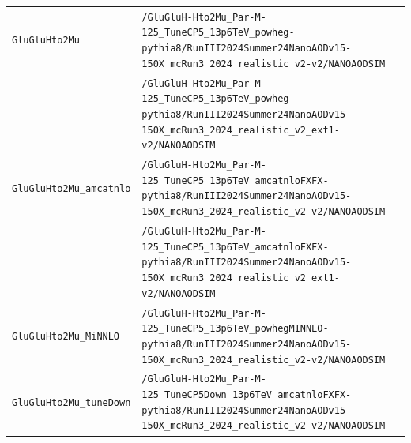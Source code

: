 \begin{longtable}{@{}>{\RaggedRight\arraybackslash}p{} >{\RaggedRight\arraybackslash}p{}@{}}
\addlinespace[2pt]
\texttt{GluGluHto2Mu} & \texttt{/\allowbreak{}GluGluH-\allowbreak{}Hto2Mu\_\allowbreak{}Par-\allowbreak{}M-\allowbreak{}125\_\allowbreak{}TuneCP5\_\allowbreak{}13p6TeV\_\allowbreak{}powheg-\allowbreak{}pythia8/\allowbreak{}RunIII2024Summer24NanoAODv15-\allowbreak{}150X\_\allowbreak{}mcRun3\_\allowbreak{}2024\_\allowbreak{}realistic\_\allowbreak{}v2-\allowbreak{}v2/\allowbreak{}NANOAODSIM} \\
 & \texttt{/\allowbreak{}GluGluH-\allowbreak{}Hto2Mu\_\allowbreak{}Par-\allowbreak{}M-\allowbreak{}125\_\allowbreak{}TuneCP5\_\allowbreak{}13p6TeV\_\allowbreak{}powheg-\allowbreak{}pythia8/\allowbreak{}RunIII2024Summer24NanoAODv15-\allowbreak{}150X\_\allowbreak{}mcRun3\_\allowbreak{}2024\_\allowbreak{}realistic\_\allowbreak{}v2\_\allowbreak{}ext1-\allowbreak{}v2/\allowbreak{}NANOAODSIM} \\
\addlinespace[2pt]
\texttt{GluGluHto2Mu\_\allowbreak{}amcatnlo} & \texttt{/\allowbreak{}GluGluH-\allowbreak{}Hto2Mu\_\allowbreak{}Par-\allowbreak{}M-\allowbreak{}125\_\allowbreak{}TuneCP5\_\allowbreak{}13p6TeV\_\allowbreak{}amcatnloFXFX-\allowbreak{}pythia8/\allowbreak{}RunIII2024Summer24NanoAODv15-\allowbreak{}150X\_\allowbreak{}mcRun3\_\allowbreak{}2024\_\allowbreak{}realistic\_\allowbreak{}v2-\allowbreak{}v2/\allowbreak{}NANOAODSIM} \\
 & \texttt{/\allowbreak{}GluGluH-\allowbreak{}Hto2Mu\_\allowbreak{}Par-\allowbreak{}M-\allowbreak{}125\_\allowbreak{}TuneCP5\_\allowbreak{}13p6TeV\_\allowbreak{}amcatnloFXFX-\allowbreak{}pythia8/\allowbreak{}RunIII2024Summer24NanoAODv15-\allowbreak{}150X\_\allowbreak{}mcRun3\_\allowbreak{}2024\_\allowbreak{}realistic\_\allowbreak{}v2\_\allowbreak{}ext1-\allowbreak{}v2/\allowbreak{}NANOAODSIM} \\
\addlinespace[2pt]
\texttt{GluGluHto2Mu\_\allowbreak{}MiNNLO} & \texttt{/\allowbreak{}GluGluH-\allowbreak{}Hto2Mu\_\allowbreak{}Par-\allowbreak{}M-\allowbreak{}125\_\allowbreak{}TuneCP5\_\allowbreak{}13p6TeV\_\allowbreak{}powhegMINNLO-\allowbreak{}pythia8/\allowbreak{}RunIII2024Summer24NanoAODv15-\allowbreak{}150X\_\allowbreak{}mcRun3\_\allowbreak{}2024\_\allowbreak{}realistic\_\allowbreak{}v2-\allowbreak{}v2/\allowbreak{}NANOAODSIM} \\
\addlinespace[2pt]
\texttt{GluGluHto2Mu\_\allowbreak{}tuneDown} & \texttt{/\allowbreak{}GluGluH-\allowbreak{}Hto2Mu\_\allowbreak{}Par-\allowbreak{}M-\allowbreak{}125\_\allowbreak{}TuneCP5Down\_\allowbreak{}13p6TeV\_\allowbreak{}amcatnloFXFX-\allowbreak{}pythia8/\allowbreak{}RunIII2024Summer24NanoAODv15-\allowbreak{}150X\_\allowbreak{}mcRun3\_\allowbreak{}2024\_\allowbreak{}realistic\_\allowbreak{}v2-\allowbreak{}v2/\allowbreak{}NANOAODSIM} \\

\end{longtable}
